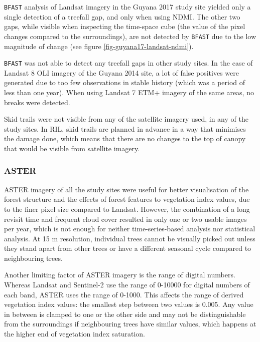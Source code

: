 \documentclass[a4paper,12pt]{scrbook}
\begin{document}
\texttt{BFAST} analysis of Landsat imagery in the Guyana 2017 study site yielded only a single detection of a treefall gap, and only when using \ac{NDMI}. The other two gaps, while visible when inspecting the time-space cube (the value of the pixel changes compared to the surroundings), are not detected by \texttt{BFAST} due to the low magnitude of change (see figure \ref{fig-guyana17-landsat-ndmi}).

\texttt{BFAST} was not able to detect any treefall gaps in other study sites. In the case of Landsat 8 \ac{OLI} imagery of the Guyana 2014 site, a lot of false positives were generated due to too few observations in stable history (which was a period of less than one year). When using Landsat 7 \ac{ETM+} imagery of the same areas, no breaks were detected.

Skid trails were not visible from any of the satellite imagery used, in any of the study sites. In \ac{RIL}, skid trails are planned in advance in a way that minimises the damage done, which means that there are no changes to the top of canopy that would be visible from satellite imagery.


\subsubsection{ASTER}


\ac{ASTER} imagery of all the study sites were useful for better visualisation of the forest structure and the effects of forest features to vegetation index values, due to the finer pixel size compared to Landsat. However, the combination of a long revisit time and frequent cloud cover resulted in only one or two usable images per year, which is not enough for neither time-series-based analysis nor statistical analysis. At 15 m resolution, individual trees cannot be visually picked out unless they stand apart from other trees or have a different seasonal cycle compared to neighbouring trees.

Another limiting factor of \ac{ASTER} imagery is the range of digital numbers. Whereas Landsat and Sentinel-2 use the range of 0-10000 for digital numbers of each band, \ac{ASTER} uses the range of 0-1000. This affects the range of derived vegetation index values: the smallest step between two values is 0.005. Any value in between is clamped to one or the other side and may not be distinguishable from the surroundings if neighbouring trees have similar values, which happens at the higher end of vegetation index saturation.
\end{document}
